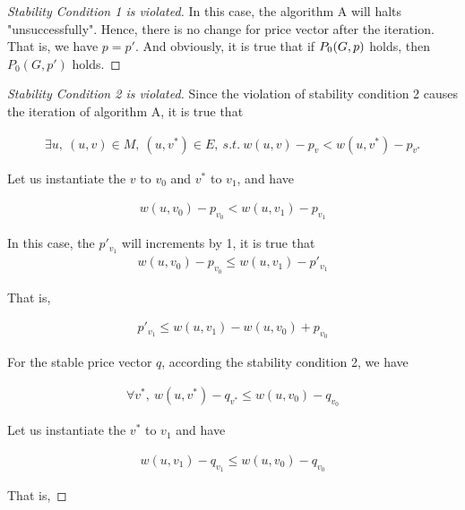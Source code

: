 \documentclass[11pt,a4paper]{article}
\begin{document}
\begin{proof}[Stability Condition 1 is violated]

    In this case, the algorithm A will halts "unsuccessfully". Hence, there is
    no change for price vector after the iteration. That is, we have $p = p'$.
    And obviously, it is true that if $P_0(G, p)$ holds, then $P_0(G, p')$ holds.

\end{proof}

\begin{proof}[Stability Condition 2 is violated]
    Since the violation of stability condition 2 causes the iteration of
    algorithm A, it is true that 
    
    \begin{align}
        \exists u,\ (u, v) \in M,\ (u, v^*) \in E,\ s.t.\ 
        w(u, v) - p_{v} < w(u, v^*) - p_{v^*}
    \end{align}
    
    Let us instantiate the $v$ to $v_0$ and $v^*$ to $v_1$, and have
    
    \begin{align}
        w(u, v_0) - p_{v_0} < w(u, v_1) - p_{v_1}
    \end{align}

    In this case, the $p'_{v_1}$ will increments by 1, it is true that
    \begin{align}
        w(u, v_0) - p_{v_0} \leq w(u, v_1) - p'_{v_1}
    \end{align}

    That is,

    \begin{align} \label{ex2:p_v_1leqbala}
         p'_{v_1} \leq w(u, v_1) - w(u, v_0) + p_{v_0}
    \end{align}

    For the stable price vector $q$, according the stability condition 2, we
    have 

    \begin{align}
        \forall v^{*},\ w(u, v^{*}) - q_{v^{*}} \leq w(u, v_0) - q_{v_0}    
    \end{align}

    Let us instantiate the $v^{*}$ to $v_1$ and have

    \begin{align}
        w(u, v_1) - q_{v_1} \leq w(u, v_0) - q_{v_0}
    \end{align}

    That is, 


\end{proof}
\end{document}
